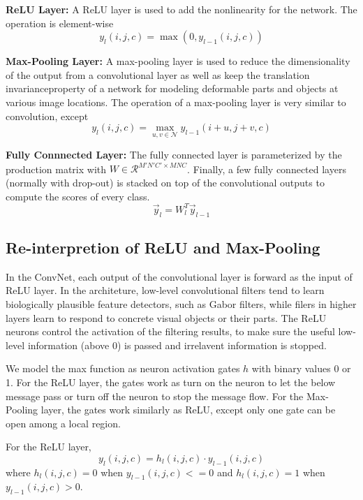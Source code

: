 \textbf{ReLU Layer:}
A ReLU layer is used to add the nonlinearity for the network. The operation is element-wise
\begin{equation}
y_l(i,j,c) = \max (0,y_{l-1}(i,j,c))
\end{equation} 

\textbf{Max-Pooling Layer:}
A max-pooling layer is used to reduce the dimensionality of the output from a convolutional layer as well as keep the translation invarianceproperty of a network for modeling deformable parts and objects at various image locations. The operation of a max-pooling layer is very similar to convolution, except  
\begin{equation}
y_l(i,j,c) = \max_{u,v \in \mathcal{N}} y_{l-1}(i+u, j+v, c)
\end{equation}

\textbf{Fully Connnected Layer:} The fully connected layer is parameterized by the production matrix with $W \in \mathcal{R}^{M'N'C' \times MNC}$. 
Finally, a few fully connected layers (normally with drop-out) is stacked on top of the convolutional outputs to compute the scores of every class. 
\begin{equation}
\vec{y}_l = W_l^T  \vec{y}_{l-1}
\end{equation}

\subsection{Re-interpretion of ReLU and Max-Pooling}
In the ConvNet, each output of the convolutional layer is forward as the input of ReLU layer. In the architeture, low-level convolutional filters tend to learn biologically plausible feature detectors, such as Gabor filters, while filers in higher layers learn to respond to concrete visual objects or their parts. The ReLU neurons control the activation of the filtering results, to make sure the useful low-level information (above 0) is passed and irrelavent information is stopped.

We model the max function as neuron activation gates $h$ with binary values 0 or 1. For the ReLU layer, the gates work as turn on the neuron to let the below message pass or turn off the neuron to stop the message flow. For the Max-Pooling layer, the gates work similarly as ReLU, except only one gate can be open among a local region.

For the ReLU layer, 
\begin{equation}
y_l(i,j,c) = h_l(i,j,c) \cdot y_{l-1}(i,j,c)
\end{equation} 
where $h_l(i,j,c) = 0$ when $y_{l-1}(i,j,c) <= 0$ and $h_l(i,j,c) = 1$ when $y_{l-1}(i,j,c) > 0$.

